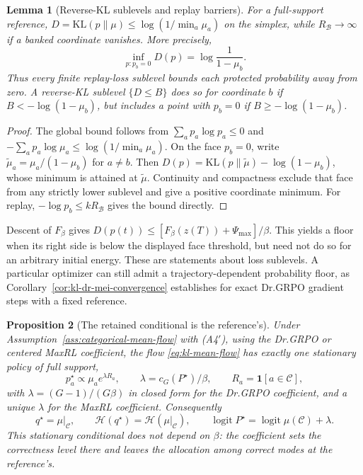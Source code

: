 \documentclass{article}
\newcommand{\enforcehalffinalproseline}{%
  \setlength{\parfillskip}{0pt plus .20\linewidth}}
\newcommand{\1}{\mathbf 1}
\newtheorem{lemma}{Lemma}[section]
\newtheorem{proposition}[lemma]{Proposition}
\theoremstyle{remark}
\theoremstyle{definition}
\theoremstyle{plain}
\begin{document}
\begin{lemma}[Reverse-KL sublevels and replay barriers]
\enforcehalffinalproseline
\label{lem:kl-no-barrier}
For a full-support reference,
$D=\mathrm{KL}(p\|\mu)\le\log(1/\min_a\mu_a)$ on the simplex, while
$R_{\mathcal B}\to\infty$ if a banked coordinate vanishes. More precisely,
\[
 \inf_{p:p_b=0}D(p)=\log\frac1{1-\mu_b}.
\]
Thus every finite replay-loss sublevel bounds each protected probability
away from zero. A reverse-KL sublevel $\{D\le B\}$ does so for coordinate $b$
if $B<-\log(1-\mu_b)$, but includes a point with $p_b=0$ if
$B\ge-\log(1-\mu_b)$.
\end{lemma}
\begin{proof}
\enforcehalffinalproseline
The global bound follows from $\sum_ap_a\log p_a\le0$ and
$-\sum_ap_a\log\mu_a\le\log(1/\min_a\mu_a)$.
On the face $p_b=0$, write $\widetilde\mu_a=\mu_a/(1-\mu_b)$ for $a\ne b$.
Then $D(p)=\mathrm{KL}(p\|\widetilde\mu)-\log(1-\mu_b)$, whose minimum is
attained at $\widetilde\mu$. Continuity and compactness exclude that face
from any strictly lower sublevel and give a positive coordinate minimum.
For replay, $-\log p_b\le kR_{\mathcal B}$ gives the bound directly.
\end{proof}

Descent of $F_\beta$ gives
$D(p(t))\le [F_\beta(z(T))+\Psi_{\max}]/\beta$.
This yields a floor when its right side is below the displayed face
threshold, but need not do so for an arbitrary initial energy. These are statements about loss sublevels. A particular optimizer can still
admit a trajectory-dependent probability floor, as
Corollary~\ref{cor:kl-dr-mei-convergence} establishes for exact Dr.GRPO
gradient steps with a fixed reference.

\begin{proposition}[The retained conditional is the reference's]
\enforcehalffinalproseline
\label{prop:kl-stationary}
Under Assumption~\ref{ass:categorical-mean-flow} with (A4$'$), using the
Dr.GRPO or centered MaxRL coefficient, the flow
\eqref{eq:kl-mean-flow} has exactly one stationary policy of full support,
\[
  p^\star_a\propto\mu_ae^{\lambda R_a},
  \qquad
  \lambda=c_G(P^\star)/\beta,
  \qquad
  R_a=\1[a\in\mathcal C],
\]
with $\lambda=(G-1)/(G\beta)$ in closed form for the Dr.GRPO coefficient, and
a unique $\lambda$ for the MaxRL coefficient. Consequently
\[
  q^\star=\mu|_{\mathcal C},
  \qquad
  \mathcal H(q^\star)=\mathcal H(\mu|_{\mathcal C}),
  \qquad
  \operatorname{logit}P^\star=\operatorname{logit}\mu(\mathcal C)+\lambda .
\]
This stationary conditional does not depend on $\beta$: the coefficient sets
the correctness level there and leaves the allocation among correct modes at
the reference's.
\end{proposition}
\end{document}
